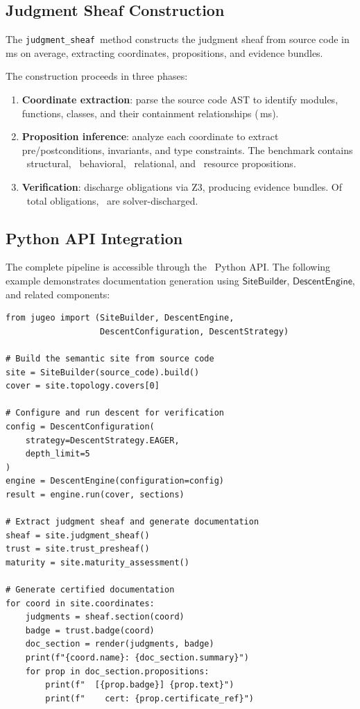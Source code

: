\documentclass[11pt]{article}
\newcommand{\JudgmentSheafAPI}{\texttt{judgment\_sheaf}}
\begin{document}
\subsection{Judgment Sheaf Construction}
The \JudgmentSheafAPI\ method constructs the judgment sheaf from source
code in \compProfJudgmentSheafMeanMs\,ms on average, extracting
coordinates, propositions, and evidence bundles.

The construction proceeds in three phases:
\begin{enumerate}[noitemsep]
\item \textbf{Coordinate extraction}: parse the source code AST to
  identify modules, functions, classes, and their containment
  relationships (\compSiteMeanBuildMs\,ms).
\item \textbf{Proposition inference}: analyze each coordinate to
  extract pre/postconditions, invariants, and type constraints.
  The benchmark contains \suppPropStructuralCount\ structural,
  \suppPropBehavioralCount\ behavioral, \suppPropRelationalCount\ relational,
  and \suppPropResourceCount\ resource propositions.
\item \textbf{Verification}: discharge obligations via Z3, producing
  evidence bundles.  Of \compTrustTotal\ total obligations,
  \compTrustSolverdischarged\ are solver-discharged.
\end{enumerate}

\subsection{Python API Integration}
The complete pipeline is accessible through the \JuGeo\ Python API.
The following example demonstrates documentation generation using
$\mathsf{SiteBuilder}$, $\mathsf{DescentEngine}$, and related
components:

\begin{lstlisting}[style=jugeo-python]
from jugeo import (SiteBuilder, DescentEngine,
                   DescentConfiguration, DescentStrategy)

# Build the semantic site from source code
site = SiteBuilder(source_code).build()
cover = site.topology.covers[0]

# Configure and run descent for verification
config = DescentConfiguration(
    strategy=DescentStrategy.EAGER,
    depth_limit=5
)
engine = DescentEngine(configuration=config)
result = engine.run(cover, sections)

# Extract judgment sheaf and generate documentation
sheaf = site.judgment_sheaf()
trust = site.trust_presheaf()
maturity = site.maturity_assessment()

# Generate certified documentation
for coord in site.coordinates:
    judgments = sheaf.section(coord)
    badge = trust.badge(coord)
    doc_section = render(judgments, badge)
    print(f"{coord.name}: {doc_section.summary}")
    for prop in doc_section.propositions:
        print(f"  [{prop.badge}] {prop.text}")
        print(f"    cert: {prop.certificate_ref}")
\end{lstlisting}
\end{document}
